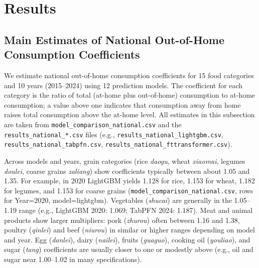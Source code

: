 
\section{Results}
\label{sec:results}

\subsection{Main Estimates of National Out-of-Home Consumption Coefficients}

We estimate national out-of-home consumption coefficients for 15 food categories and 10 years (2015--2024) using 12 prediction models. The coefficient for each category is the ratio of total (at-home plus out-of-home) consumption to at-home consumption; a value above one indicates that consumption away from home raises total consumption above the at-home level. All estimates in this subsection are taken from \texttt{model\_comparison\_national.csv} and the \texttt{results\_national\_*.csv} files (e.g., \texttt{results\_national\_lightgbm.csv}, \texttt{results\_national\_tabpfn.csv}, \texttt{results\_national\_fttransformer.csv}).

Across models and years, grain categories (rice \textit{daogu}, wheat \textit{xiaomai}, legumes \textit{doulei}, coarse grains \textit{zaliang}) show coefficients typically between about 1.05 and 1.35. For example, in 2020 LightGBM yields 1.128 for rice, 1.153 for wheat, 1.182 for legumes, and 1.153 for coarse grains (\texttt{model\_comparison\_national.csv}, rows for Year=2020, model=lightgbm). Vegetables (\textit{shucai}) are generally in the 1.05--1.19 range (e.g., LightGBM 2020: 1.069; TabPFN 2024: 1.187). Meat and animal products show larger multipliers: pork (\textit{zhurou}) often between 1.16 and 1.38, poultry (\textit{qinlei}) and beef (\textit{niurou}) in similar or higher ranges depending on model and year. Egg (\textit{danlei}), dairy (\textit{nailei}), fruits (\textit{guaguo}), cooking oil (\textit{youliao}), and sugar (\textit{tang}) coefficients are usually closer to one or modestly above (e.g., oil and sugar near 1.00--1.02 in many specifications).

